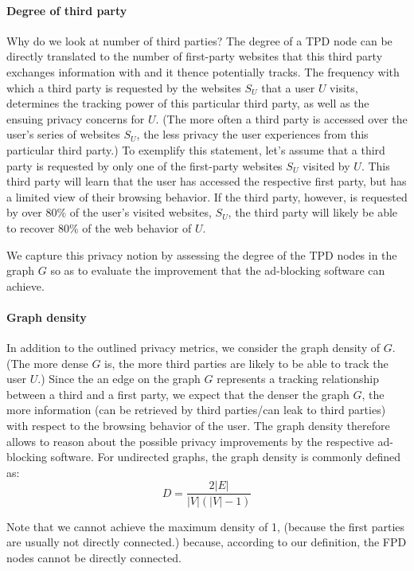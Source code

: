 \documentclass{sig-alternate}
\begin{document}
\paragraph{Degree of third party}
{\color{red}Why do we look at number of third parties?}
{\color{blue}The degree of a TPD node can be directly translated to the number of first-party websites that this third party exchanges information with and it thence potentially tracks. The frequency with which a third party is requested by the websites $S_U$ that a user $U$ visits, determines the tracking power of this particular third party, as well as the ensuing privacy concerns for $U$.}
{\color{red}(The more often a third party is accessed over the user's series of websites $S_U$, the less privacy the user experiences from this particular third party.)} To exemplify this statement, let's assume that a third party is requested by only one of the first-party websites $S_U$ visited by $U$. This third party will learn that the user has accessed the respective first party, but has a limited view of their browsing behavior. If the third party, however, is requested by over 80\% of the user's visited websites, $S_U$, the third party will likely be able to recover 80\% of the web behavior of $U$.

We capture this privacy notion by assessing the degree of the TPD nodes in the graph $G$ so as to evaluate the improvement that the ad-blocking software can achieve.

\paragraph{Graph density}
In addition to the outlined privacy metrics, we consider the graph density of $G$. {\color{red}(The more dense $G$ is, the more third parties are likely to be able to track the user $U$.)} {\color{blue}Since the an edge on the graph $G$ represents a tracking relationship between a third and a first party, we expect that the denser the graph $G$, the more information (can be retrieved by third parties/can leak to third parties) with respect to the browsing behavior of the user}. The graph density therefore allows to reason about the possible privacy improvements by the respective ad-blocking software. For undirected graphs, the graph density is commonly defined as:
\begin{equation}
D = \frac{2 |E|}{|V|(|V|-1)}
\end{equation}

Note that we cannot achieve the maximum density of 1, {\color{red}(because the first parties are usually not directly connected.)} {\color{blue}because, according to our definition, the FPD nodes cannot be directly connected.}
\end{document}
